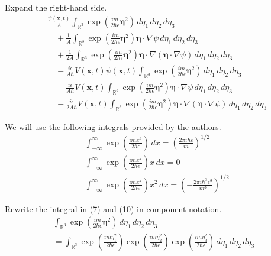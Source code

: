 \documentclass[12pt]{article}
\begin{document}
Expand the right-hand side.
\begin{align*}
&\frac{\psi(\mathbf x,t)}{A}\int_{\mathbb R^3}
\exp\left(\frac{im}{2\hbar\epsilon}\boldsymbol\eta^2\right)
\,d\eta_1\,d\eta_2\,d\eta_3
\tag{7}
\\
&\quad{}+\frac{1}{A}\int_{\mathbb R^3}
\exp\left(\frac{im}{2\hbar\epsilon}\boldsymbol\eta^2\right)
\boldsymbol\eta\cdot\nabla\psi
\,d\eta_1\,d\eta_2\,d\eta_3
\tag{8}
\\
&\quad{}+\frac{1}{2A}\int_{\mathbb R^3}
\exp\left(\frac{im}{2\hbar\epsilon}\boldsymbol\eta^2\right)
\boldsymbol\eta\cdot\nabla(\boldsymbol\eta\cdot\nabla\psi)
\,d\eta_1\,d\eta_2\,d\eta_3
\tag{9}
\\
&\quad{}-\frac{i\epsilon}{A\hbar}V\left(\mathbf x,t\right)\psi(\mathbf x,t)\int_{\mathbb R^3}
\exp\left(\frac{im}{2\hbar\epsilon}\boldsymbol\eta^2\right)
\,d\eta_1\,d\eta_2\,d\eta_3
\tag{10}
\\
&\quad{}-\frac{i\epsilon}{A\hbar}V\left(\mathbf x,t\right)\int_{\mathbb R^3}
\exp\left(\frac{im}{2\hbar\epsilon}\boldsymbol\eta^2\right)
\boldsymbol\eta\cdot\nabla\psi
\,d\eta_1\,d\eta_2\,d\eta_3
\tag{11}
\\
&\quad{}-\frac{i\epsilon}{2A\hbar}V\left(\mathbf x,t\right)\int_{\mathbb R^3}
\exp\left(\frac{im}{2\hbar\epsilon}\boldsymbol\eta^2\right)
\boldsymbol\eta\cdot\nabla(\boldsymbol\eta\cdot\nabla\psi)
\,d\eta_1\,d\eta_2\,d\eta_3
\tag{12}
\end{align*}

We will use the following integrals provided by the authors.
\begin{align*}
&\int_{-\infty}^\infty\exp\left(\frac{imx^2}{2\hbar\epsilon}\right)\,dx
=\left(\frac{2\pi i\hbar\epsilon}{m}\right)^{1/2}
\tag{13}
\\
&\int_{-\infty}^\infty\exp\left(\frac{imx^2}{2\hbar\epsilon}\right)x\,dx
=0
\tag{14}
\\
&\int_{-\infty}^\infty\exp\left(\frac{imx^2}{2\hbar\epsilon}\right)x^2\,dx
=\left(-\frac{2\pi i\hbar^3\epsilon^3}{m^3}\right)^{1/2}
\tag{15}
\end{align*}

Rewrite the integral in (7) and (10) in component notation.
\begin{multline*}
\int_{\mathbb R^3}
\exp\left(\frac{im}{2\hbar\epsilon}\boldsymbol\eta^2\right)
\,d\eta_1\,d\eta_2\,d\eta_3
\\
{}=\int_{\mathbb R^3}
\exp\left(\frac{im\eta_1^2}{2\hbar\epsilon}\right)
\exp\left(\frac{im\eta_2^2}{2\hbar\epsilon}\right)
\exp\left(\frac{im\eta_3^2}{2\hbar\epsilon}\right)
\,d\eta_1\,d\eta_2\,d\eta_3
\end{multline*}
\end{document}
